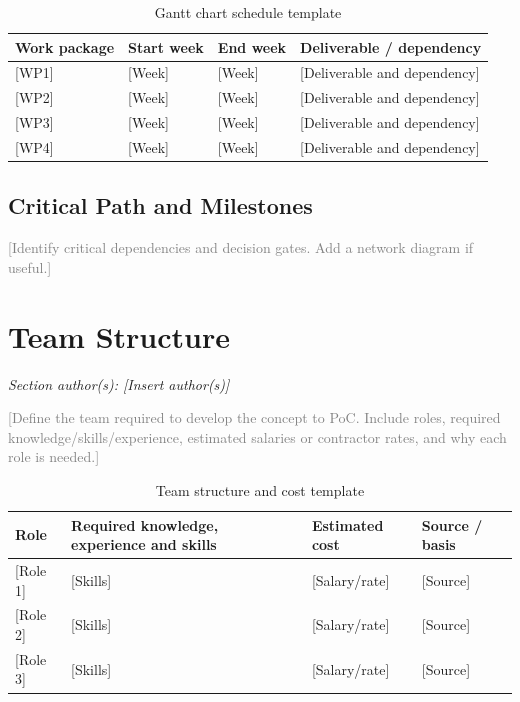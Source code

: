 \documentclass[11pt,a4paper]{article}
\newcommand{\placeholder}[1]{\textcolor{gray}{#1}}
\begin{document}
\begin{table}[H]
\centering
\caption{Gantt chart schedule template}
\footnotesize
\begin{tabularx}{\textwidth}{Y L{3cm} L{3cm}Y}
\toprule
\textbf{Work package} & \textbf{Start week} & \textbf{End week} & \textbf{Deliverable / dependency} \\
\midrule
{}[WP1] & [Week] & [Week] & [Deliverable and dependency] \\
{}[WP2] & [Week] & [Week] & [Deliverable and dependency] \\
{}[WP3] & [Week] & [Week] & [Deliverable and dependency] \\
{}[WP4] & [Week] & [Week] & [Deliverable and dependency] \\
\bottomrule
\end{tabularx}
\end{table}

\subsection{Critical Path and Milestones}
\placeholder{[Identify critical dependencies and decision gates. Add a network diagram if useful.]}

\section{Team Structure}
\textit{Section author(s): [Insert author(s)]}

\placeholder{[Define the team required to develop the concept to PoC. Include roles, required knowledge/skills/experience, estimated salaries or contractor rates, and why each role is needed.]}

\begin{table}[H]
\centering
\caption{Team structure and cost template}
\footnotesize
\begin{tabularx}{\textwidth}{L{3cm}Y L{3cm}Y}
\toprule
\textbf{Role} & \textbf{Required knowledge, experience and skills} & \textbf{Estimated cost} & \textbf{Source / basis} \\
\midrule
{}[Role 1] & [Skills] & [Salary/rate] & [Source] \\
{}[Role 2] & [Skills] & [Salary/rate] & [Source] \\
{}[Role 3] & [Skills] & [Salary/rate] & [Source] \\
\bottomrule
\end{tabularx}
\end{table}
\end{document}
